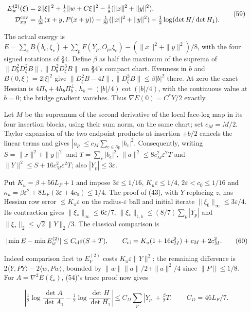 \documentclass[11pt,a4paper]{article}
\begin{document}
\[\begin{aligned}
E_w^{(2)}(\xi)&=2\|\xi\|^2+\tfrac14\|w+C\xi\|^2
 -\tfrac18(\|x\|^2+\|y\|^2),\\
\mathcal D_{xy}^{\rm cov}&=\tfrac1{2t}\langle x+y,P(x+y)\rangle
 -\tfrac1{8t}(\|x\|^2+\|y\|^2)+\tfrac12\log(\det H/\det H_1).
\end{aligned}\tag{59}\]

The actual energy is
\(E=\sum_e B(b_e,\xi_e)+\sum_p F(Y_p,O_{pe}\xi_e) -(\|x\|^2+\|y\|^2)/8\),
with the four signed rotations of §4. Define \(\beta\) as half the
maximum of the suprema of \(\|D_b^2D_\xi^2B\|,\|D_b^2D_\xi^3B\|\) on
§4's compact chart. Evenness in \(b\) and \(B(0,\xi)=2|\xi|^2\) give
\(\|D_\xi^2B-4I\|,\|D_\xi^3B\|\le\beta|b|^2\) there. At zero the exact
Hessian is \(4\Pi_b+4h_b\Pi_b^\perp\), \(h_b=(|b|/4)\cot(|b|/4)\), with
the continuous value at \(b=0\); the bridge gradient vanishes. Thus
\(\nabla E(0)=C^*Y/2\) exactly.

Let \(M\) be the supremum of the second derivative of the local face-log
map in its four insertion blocks, using their sum norm, on the same
chart; set \(c_M=M/2\). Taylor expansion of the two endpoint products at
insertion \(\pm b/2\) cancels the linear terms and gives
\(|a_p|\le c_M\sum_{e\in\partial p}|b_e|^2\). Consequently, writing
\(S=\|x\|^2+\|y\|^2\) and \(T=\sum_e|b_e|^2\),
\(\|a\|^2\le8c_M^2\varepsilon^2T\) and
\(\|Y\|^2\le S+16c_M^2\varepsilon^2T\); also \(|Y_p|\le3\varepsilon\).

Put \(K_u=\beta+56L_F+1\) and impose \(3\varepsilon\le1/16\),
\(K_u\varepsilon\le1/4\), \(2\varepsilon<c_0\le1/16\) and
\(\kappa_u=\beta\varepsilon^2+8L_F(3\varepsilon+4c_0)\le1/4\). The proof
of (43), with \(Y\) replacing \(z\), has Hessian row error
\(\le K_u\varepsilon\) on the radius-\(\varepsilon\) ball and initial
iterate \(\|\xi_0\|_\infty\le3\varepsilon/4\). Its contraction gives
\(\|\xi_*\|_\infty\le6\varepsilon/7\),
\(\|\xi_*\|_{1,b}\le(8/7)\sum_p|Y_p|\) and
\(\|\xi_*\|_2\le\sqrt2\|Y\|_2/3\). The classical comparison is

\[|\min E-\min E_w^{(2)}|\le C_{\rm cl}\varepsilon(S+T),\qquad
C_{\rm cl}=K_u(1+16c_M^2)+c_M+2c_M^2.\tag{60}\]

Indeed comparison first to \(E_Y^{(2)}\) costs
\(K_u\varepsilon\|Y\|^2\); the remaining difference is
\(2\langle Y,PY\rangle-2\langle w,Pw\rangle\), bounded by
\(\|w\|\|a\|/2+\|a\|^2/4\) since \(\|P\|\le1/8\). For
\(A=\nabla^2E(\xi_*)\), (54)'s trace proof now gives

\[\left|\tfrac12\log\frac{\det A}{\det A_1}
-\tfrac12\log\frac{\det H}{\det H_1}\right|
\le C_D\sum_p|Y_p|+\tfrac\beta2 T,\qquad C_D=46L_F/7.\tag{61}\]
\end{document}

